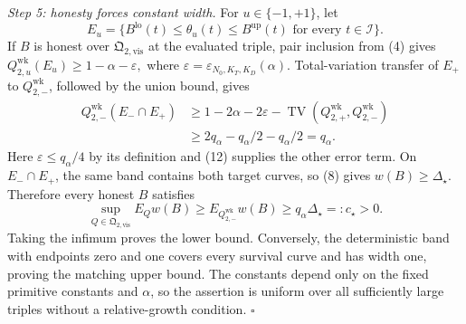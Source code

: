 \emph{Step 5: honesty forces constant width.}
For \(u\in\{-1,+1\}\), let
\[
 E_u=\{B^{\mathrm{lo}}(t)\le\theta_u(t)\le B^{\mathrm{up}}(t)
       \text{ for every }t\in\mathcal I\}.
\]
If \(B\) is honest over \(\mathfrak Q_{2,\mathrm{vis}}\) at the evaluated triple, pair inclusion from (4) gives
\(
 Q_{2,u}^{\mathrm{wk}}(E_u)\ge1-\alpha-\varepsilon,
\)
where \(\varepsilon=\varepsilon_{N_0,K_T,K_D}(\alpha)\).  Total-variation transfer of \(E_+\) to \(Q_{2,-}^{\mathrm{wk}}\), followed by the union bound, gives
\[
 \begin{aligned}
 Q_{2,-}^{\mathrm{wk}}(E_-\cap E_+)
 &\ge1-2\alpha-2\varepsilon
      -\operatorname{TV}(Q_{2,+}^{\mathrm{wk}},Q_{2,-}^{\mathrm{wk}})\\
 &\ge2q_\alpha-q_\alpha/2-q_\alpha/2=q_\alpha.        \tag{13}
 \end{aligned}
\]
Here \(\varepsilon\le q_\alpha/4\) by its definition and (12) supplies the other error term.  On \(E_-\cap E_+\), the same band contains both target curves, so (8) gives \(w(B)\ge\Delta_\star\).  Therefore every honest \(B\) satisfies
\[
 \sup_{Q\in\mathfrak Q_{2,\mathrm{vis}}}E_Qw(B)
 \ge E_{Q_{2,-}^{\mathrm{wk}}}w(B)
 \ge q_\alpha\Delta_\star=:c_\star>0.                 \tag{14}
\]
Taking the infimum proves the lower bound.  Conversely, the deterministic band with endpoints zero and one covers every survival curve and has width one, proving the matching upper bound.  The constants depend only on the fixed primitive constants and \(\alpha\), so the assertion is uniform over all sufficiently large triples without a relative-growth condition. \(\square\)